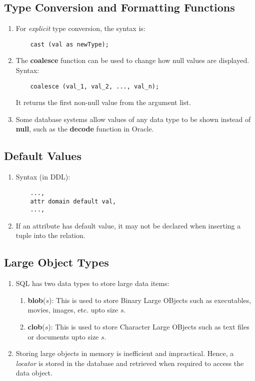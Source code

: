 \documentclass[journal,12pt,twocolumn]{IEEEtran}
\begin{document}
\subsection{Type Conversion and Formatting Functions}
\begin{enumerate}
    \item For \textit{explicit} type conversion, the syntax is:
    \begin{lstlisting}
    cast (val as newType);
    \end{lstlisting}
    \item The \textbf{coalesce} function can be used to change how null values 
    are displayed. Syntax:
    \begin{lstlisting}
    coalesce (val_1, val_2, ..., val_n);
    \end{lstlisting}
    It returns the first non-null value from the argument list.
    \item Some database systems allow values of any data type to be shown 
    instead of \textbf{null}, such as the \textbf{decode} function in Oracle.
\end{enumerate}

\subsection{Default Values}
\begin{enumerate}
    \item Syntax (in DDL):
    \begin{lstlisting}
    ...,
    attr domain default val,
    ...,
    \end{lstlisting}
    \item If an attribute has default value, it may not be declared when 
    inserting a tuple into the relation.
\end{enumerate}

\subsection{Large Object Types}
\begin{enumerate}
    \item SQL has two data types to store large data items:
    \begin{enumerate}
        \item \textbf{blob}($s$): This is used to store Binary Large OBjects 
        such as executables, movies, images, etc. upto size $s$.
        \item \textbf{clob}($s$): This is used to store Character Large OBjects 
        such as text files or documents upto size $s$.
    \end{enumerate}
    \item Storing large objects in memory is inefficient and impractical. Hence, 
    a \textit{locator} is stored in the database and retrieved when required to 
    access the data object.
\end{enumerate}
\end{document}
